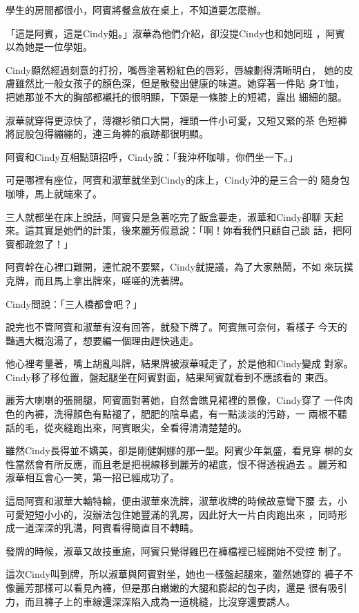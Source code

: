 學生的房間都很小，阿賓將餐盒放在桌上，不知道要怎麼辦。

「這是阿賓，這是Cindy姐。」淑華為他們介紹，卻沒提Cindy也和她同班
，阿賓以為她是一位學姐。

Cindy顯然經過刻意的打扮，嘴唇塗著粉紅色的唇彩，唇線劃得清晰明白，
她的皮膚雖然比一般女孩子的顏色深，但是散發出健康的味道。她穿著一件貼
身T恤，把她那並不大的胸部都襯托的很明顯，下頭是一條膝上的短裙，露出
細細的腿。

淑華就穿得更涼快了，薄襯衫領口大開，裡頭一件小可愛，又短又緊的茶
色短褲將屁股包得繃繃的，連三角褲的痕跡都很明顯。

阿賓和Cindy互相點頭招呼，Cindy說：「我沖杯咖啡，你們坐一下。」

可是哪裡有座位，阿賓和淑華就坐到Cindy的床上，Cindy沖的是三合一的
隨身包咖啡，馬上就端來了。

三人就都坐在床上說話，阿賓只是急著吃完了飯盒要走，淑華和Cindy卻聊
天起來。這其實是她們的計策，後來麗芳假意說：「啊！妳看我們只顧自己談
話，把阿賓都疏忽了！」

阿賓幹在心裡口難開，連忙說不要緊，Cindy就提議，為了大家熱鬧，不如
來玩撲克牌，而且馬上拿出牌來，嗟嗟的洗著牌。

Cindy問說：「三人橋都會吧？」

說完也不管阿賓和淑華有沒有回答，就發下牌了。阿賓無可奈何，看樣子
今天的豔遇大概泡湯了，想要編一個理由趕快逃走。

他心裡考量著，嘴上胡亂叫牌，結果牌被淑華喊走了，於是他和Cindy變成
對家。Cindy移了移位置，盤起腿坐在阿賓對面，結果阿賓就看到不應該看的
東西。

麗芳大喇喇的張開腿，阿賓面對著她，自然會瞧見裙裡的景像，Cindy穿了
一件肉色的內褲，洗得顏色有點褪了，肥肥的陰阜處，有一點淡淡的污跡，一
兩根不聽話的毛，從夾縫跑出來，阿賓眼尖，全看得清清楚楚的。

雖然Cindy長得並不嬌美，卻是剛健婀娜的那一型。阿賓少年氣盛，看見穿
梆的女性當然會有所反應，而且老是把視線移到麗芳的裙底，恨不得透視過去
。麗芳和淑華相互會心一笑，第一招已經成功了。

這局阿賓和淑華大輸特輸，便由淑華來洗牌，淑華收牌的時候故意彎下腰
去，小可愛短短小小的，沒辦法包住她豐滿的乳房，因此好大一片白肉跑出來
，同時形成一道深深的乳溝，阿賓看得簡直目不轉睛。

發牌的時候，淑華又故技重施，阿賓只覺得雞巴在褲檔裡已經開始不受控
制了。

這次Cindy叫到牌，所以淑華與阿賓對坐，她也一樣盤起腿來，雖然她穿的
褲子不像麗芳那樣可以看見內褲，但是那白嫩嫩的大腿和膨起的包子肉，還是
很有吸引力，而且褲子上的車線還深深陷入成為一道桃縫，比沒穿還要誘人。

